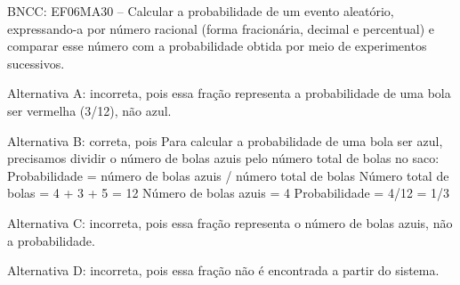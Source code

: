 BNCC: EF06MA30 -- Calcular a probabilidade de um evento aleatório,
expressando-a por número racional (forma fracionária, decimal e
percentual) e comparar esse número com a probabilidade obtida por meio
de experimentos sucessivos.

Alternativa A: incorreta, pois essa fração representa a probabilidade de
uma bola ser vermelha (3/12), não azul.

Alternativa B: correta, pois Para calcular a probabilidade de uma bola
ser azul, precisamos dividir o número de bolas azuis pelo número total
de bolas no saco: Probabilidade = número de bolas azuis / número total
de bolas Número total de bolas = 4 + 3 + 5 = 12 Número de bolas azuis =
4 Probabilidade = 4/12 = 1/3

Alternativa C: incorreta, pois essa fração representa o número de bolas
azuis, não a probabilidade.

Alternativa D: incorreta, pois essa fração não é encontrada a partir do
sistema.
